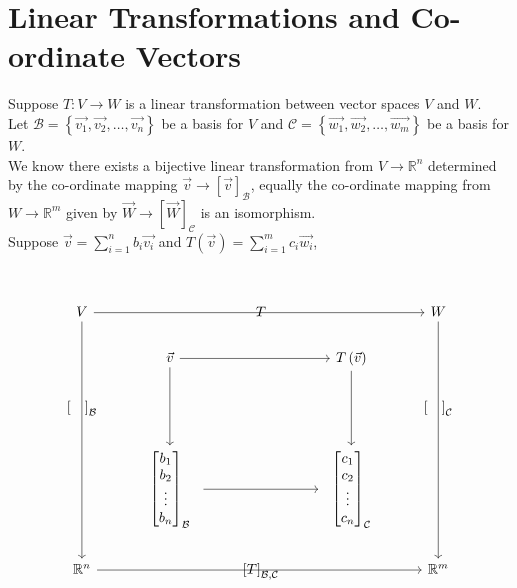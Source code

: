 \documentclass{report}
\begin{document}
  \section{Linear Transformations and Co-ordinate Vectors}
 Suppose $ T: V \to W$ is a linear transformation between vector spaces $ V$ and $ W$.\\
  Let $ \mathcal{B} = \left\{ \vec{ v_1} , \vec{ v_2} , \ldots , \vec{ v_n}  \right\}$ be a basis for $ V$ and $ \mathcal{C} = \left\{ \vec{ w_1} , \vec{ w_2} , \ldots , \vec{ w_m}  \right\}$ be a basis for $ W$.\\
  We know there exists a bijective linear transformation from $ V \to \mathbb{R} ^{n}$ determined by the co-ordinate mapping $ \vec{ v} \to \left[ \vec{ v}  \right] _{ \mathcal{B}}$, equally the co-ordinate mapping  from $ W \to \mathbb{R} ^{m}$ given by $ \vec{ W} \to \left[ \vec{ W}  \right] _{ \mathcal{C}}$ is an isomorphism.\\
   Suppose $ \vec{ v} = \sum\limits_{i=1}^{n} b_i \vec{ v_i}$ and     $ T \left( \vec{ v}  \right) = \sum\limits_{i=1}^{m} c_i \vec{ w_i}$,\\
   \\
                            \\
 \[\begin{tikzcd}
	V && T && W \\
	& {\vec{v}} && {T\left(\vec{v} \right)} \\
	{\left[ \quad \right]_{\mathcal{B}}} &&&& {\left[ \quad \right]_{\mathcal{C}}} \\
	& \begin{array}{c} \begin{bmatrix} b_1\\ b_2 \\ \vdots \\ b_n\end{bmatrix}_{\mathcal{B}} \end{array} && \begin{array}{c} \begin{bmatrix} c_1\\ c_2 \\ \vdots \\ c_n\end{bmatrix}_{\mathcal{C}} \end{array} \\
	{\mathbb{R}^n} && {\left[T \right]_{\mathcal{B}, \mathcal{C}}} && {\mathbb{R}^m}
	\arrow[from=1-1, to=1-5]
	\arrow[from=1-1, to=5-1]
	\arrow[from=1-5, to=5-5]
	\arrow[from=2-2, to=2-4]
	\arrow[from=2-2, to=4-2]
	\arrow[from=2-4, to=4-4]
	\arrow[from=4-2, to=4-4]
	\arrow[from=5-1, to=5-5]
\end{tikzcd}\]
\end{document}

